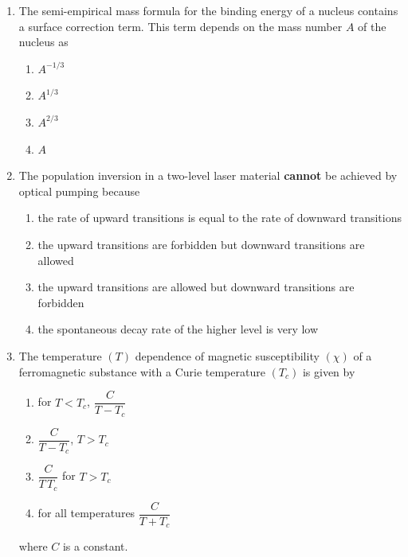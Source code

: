\documentclass[journal,12pt,onecolumn]{IEEEtran}
\begin{document}
\begin{enumerate}
\item The semi-empirical mass formula for the binding energy of a nucleus contains a surface correction term. This term depends on the mass number $A$ of the nucleus as

\hfill{}

\begin{multicols}{4}
\begin{enumerate}
    \item $A^{-1/3}$
    \item $A^{1/3}$
    \item $A^{2/3}$
    \item $A$
\end{enumerate}
\end{multicols}

\item The population inversion in a two-level laser material \textbf{cannot} be achieved by optical pumping because

\hfill{}


\begin{enumerate}
    \item the rate of upward transitions is equal to the rate of downward transitions
    \item the upward transitions are forbidden but downward transitions are allowed
    \item the upward transitions are allowed but downward transitions are forbidden
    \item the spontaneous decay rate of the higher level is very low
\end{enumerate}


\item The temperature $(T)$ dependence of magnetic susceptibility $(\chi)$ of a ferromagnetic substance with a Curie temperature $(T_{c})$ is given by

\hfill{}

\begin{multicols}{2}
\begin{enumerate}
    \item for $T < T_{c}$, $\dfrac{C}{T - T_{c}}$
    \item $\dfrac{C}{T - T_{c}}$, $T > T_{c}$
    \item $\dfrac{C}{T \, T_{c}}$ for $T > T_{c}$
    \item for all temperatures $\dfrac{C}{T + T_{c}}$
\end{enumerate}
\end{multicols}
where $C$ is a constant.


\end{enumerate}
\end{document}
